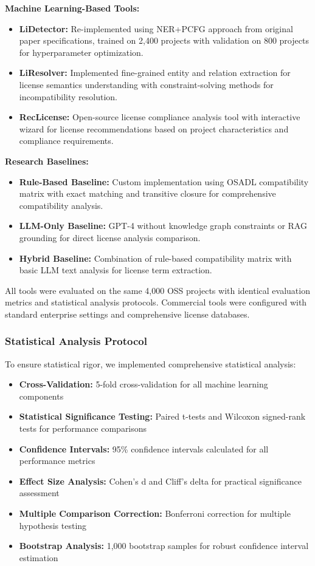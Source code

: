 \textbf{Machine Learning-Based Tools:}
\begin{itemize}
    \item \textbf{LiDetector:} Re-implemented using NER+PCFG approach from original paper specifications, trained on 2,400 projects with validation on 800 projects for hyperparameter optimization.
    \item \textbf{LiResolver:} Implemented fine-grained entity and relation extraction for license semantics understanding with constraint-solving methods for incompatibility resolution.
    \item \textbf{RecLicense:} Open-source license compliance analysis tool with interactive wizard for license recommendations based on project characteristics and compliance requirements.
\end{itemize}

\textbf{Research Baselines:}
\begin{itemize}
    \item \textbf{Rule-Based Baseline:} Custom implementation using OSADL compatibility matrix with exact matching and transitive closure for comprehensive compatibility analysis.
    \item \textbf{LLM-Only Baseline:} GPT-4 without knowledge graph constraints or RAG grounding for direct license analysis comparison.
    \item \textbf{Hybrid Baseline:} Combination of rule-based compatibility matrix with basic LLM text analysis for license term extraction.
\end{itemize}

All tools were evaluated on the same 4,000 OSS projects with identical evaluation metrics and statistical analysis protocols. Commercial tools were configured with standard enterprise settings and comprehensive license databases.

\subsubsection{Statistical Analysis Protocol}
To ensure statistical rigor, we implemented comprehensive statistical analysis:

\begin{itemize}
    \item \textbf{Cross-Validation:} 5-fold cross-validation for all machine learning components
    \item \textbf{Statistical Significance Testing:} Paired t-tests and Wilcoxon signed-rank tests for performance comparisons
    \item \textbf{Confidence Intervals:} 95\% confidence intervals calculated for all performance metrics
    \item \textbf{Effect Size Analysis:} Cohen's d and Cliff's delta for practical significance assessment
    \item \textbf{Multiple Comparison Correction:} Bonferroni correction for multiple hypothesis testing
    \item \textbf{Bootstrap Analysis:} 1,000 bootstrap samples for robust confidence interval estimation
\end{itemize}

